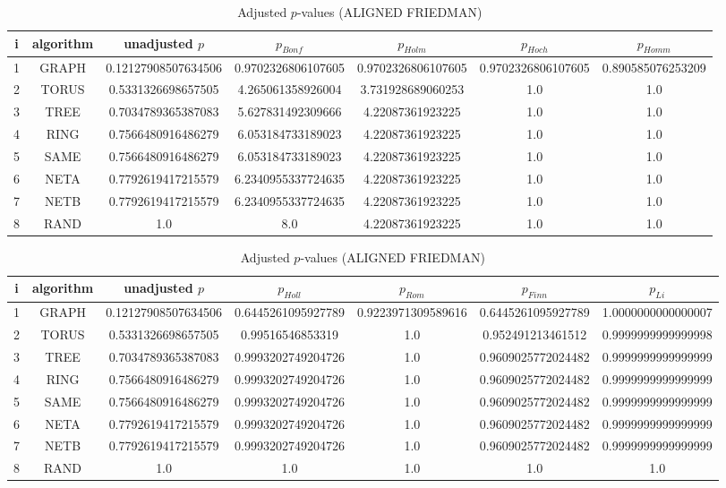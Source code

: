 \documentclass[a4paper,10pt]{article}
\begin{document}
\begin{landscape}
\newpage

\begin{table}[!htp]
\centering\scriptsize
\caption{Adjusted $p$-values (ALIGNED FRIEDMAN)}
\begin{tabular}{ccccccc}
i&algorithm&unadjusted $p$&$p_{Bonf}$&$p_{Holm}$&$p_{Hoch}$&$p_{Homm}$\\
\hline
1& GRAPH&0.12127908507634506&0.9702326806107605&0.9702326806107605&0.9702326806107605&0.890585076253209\\
2& TORUS&0.5331326698657505&4.265061358926004&3.731928689060253&1.0&1.0\\
3& TREE&0.7034789365387083&5.627831492309666&4.22087361923225&1.0&1.0\\
4& RING&0.7566480916486279&6.053184733189023&4.22087361923225&1.0&1.0\\
5& SAME&0.7566480916486279&6.053184733189023&4.22087361923225&1.0&1.0\\
6& NETA&0.7792619417215579&6.2340955337724635&4.22087361923225&1.0&1.0\\
7& NETB&0.7792619417215579&6.2340955337724635&4.22087361923225&1.0&1.0\\
8& RAND&1.0&8.0&4.22087361923225&1.0&1.0\\
\hline
\end{tabular}
\end{table}

\begin{table}[!htp]
\centering\scriptsize
\caption{Adjusted $p$-values (ALIGNED FRIEDMAN)}
\begin{tabular}{ccccccc}
i&algorithm&unadjusted $p$&$p_{Holl}$&$p_{Rom}$&$p_{Finn}$&$p_{Li}$\\
\hline
1& GRAPH&0.12127908507634506&0.6445261095927789&0.9223971309589616&0.6445261095927789&1.0000000000000007\\
2& TORUS&0.5331326698657505&0.99516546853319&1.0&0.952491213461512&0.9999999999999998\\
3& TREE&0.7034789365387083&0.9993202749204726&1.0&0.9609025772024482&0.9999999999999999\\
4& RING&0.7566480916486279&0.9993202749204726&1.0&0.9609025772024482&0.9999999999999999\\
5& SAME&0.7566480916486279&0.9993202749204726&1.0&0.9609025772024482&0.9999999999999999\\
6& NETA&0.7792619417215579&0.9993202749204726&1.0&0.9609025772024482&0.9999999999999999\\
7& NETB&0.7792619417215579&0.9993202749204726&1.0&0.9609025772024482&0.9999999999999999\\
8& RAND&1.0&1.0&1.0&1.0&1.0\\
\hline
\end{tabular}
\end{table}



\end{landscape}
\end{document}
